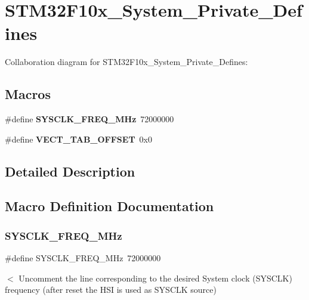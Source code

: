 \section{S\+T\+M32\+F10x\+\_\+\+System\+\_\+\+Private\+\_\+\+Defines}
\label{group___s_t_m32_f10x___system___private___defines}
Collaboration diagram for S\+T\+M32\+F10x\+\_\+\+System\+\_\+\+Private\+\_\+\+Defines\+:
\subsection*{Macros}
\begin{DoxyCompactItemize}
\item 
\#define \textbf{ S\+Y\+S\+C\+L\+K\+\_\+\+F\+R\+E\+Q\+\_\+M\+Hz}~72000000
\item 
\#define \textbf{ V\+E\+C\+T\+\_\+\+T\+A\+B\+\_\+\+O\+F\+F\+S\+ET}~0x0
\end{DoxyCompactItemize}


\subsection{Detailed Description}


\subsection{Macro Definition Documentation}
\mbox{\label{group___s_t_m32_f10x___system___private___defines_ga69649cc38f34627cfb48b51062ebd390}} 
\subsubsection{S\+Y\+S\+C\+L\+K\+\_\+\+F\+R\+E\+Q\+\_\+M\+Hz}
{\footnotesize\ttfamily \#define S\+Y\+S\+C\+L\+K\+\_\+\+F\+R\+E\+Q\+\_\+M\+Hz~72000000}

$<$ Uncomment the line corresponding to the desired System clock (S\+Y\+S\+C\+LK) frequency (after reset the H\+SI is used as S\+Y\+S\+C\+LK source)

